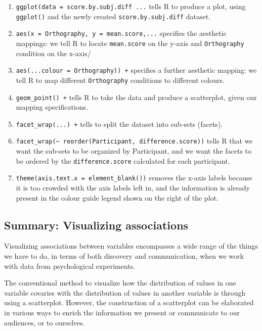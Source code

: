 \documentclass[
  letterpaper,
  DIV=11,
  numbers=noendperiod]{scrreprt}
\providecommand{\tightlist}{%
  \setlength{\itemsep}{0pt}\setlength{\parskip}{0pt}}\usepackage{longtable,booktabs,array}
\begin{document}
\begin{enumerate}
\def\labelenumi{\arabic{enumi}.}
\tightlist
\item
  \texttt{ggplot(data\ =\ score.by.subj.diff\ ...} tells R to produce a
  plot, using \texttt{ggplot()} and the newly created
  \texttt{score.by.subj.diff} dataset.
\item
  \texttt{aes(x\ =\ Orthography,\ y\ =\ mean.score,...} specifies the
  aesthetic mappings: we tell R to locate \texttt{mean.score} on the
  y-axis and \texttt{Orthography} condition on the x-axis/
\item
  \texttt{aes(...colour\ =\ Orthography))\ +} specifies a further
  aesthetic mapping: we tell R to map different \texttt{Orthography}
  conditions to different colours.
\item
  \texttt{geom\_point()\ +} tells R to take the data and produce a
  scatterplot, given our mapping specifications.
\item
  \texttt{facet\_wrap(...)\ +} tells to split the dataset into sub-sets
  (facets).
\item
  \texttt{facet\_wrap(\textasciitilde{}\ reorder(Participant,\ difference.score))}
  tells R that we want the sub-sets to be organized by Participant, and
  we want the facets to be ordered by the \texttt{difference.score}
  calculated for each participant.
\item
  \texttt{theme(axis.text.x\ =\ element\_blank())} removes the x-axis
  labels because it is too crowded with the axis labels left in, and the
  information is already present in the colour guide legend shown on the
  right of the plot.
\end{enumerate}

\hypertarget{summary-visualizing-associations}{%
\subsection{Summary: Visualizing
associations}\label{summary-visualizing-associations}}

Visualizing associations between variables encompasses a wide range of
the things we have to do, in terms of both discovery and communication,
when we work with data from psychological experiments.

The conventional method to visualize how the distribution of values in
one variable covaries with the distribution of values in another
variable is through using a scatterplot. However, the construction of a
scatterplot can be elaborated in various ways to enrich the information
we present or communicate to our audiences, or to ourselves.
\end{document}
